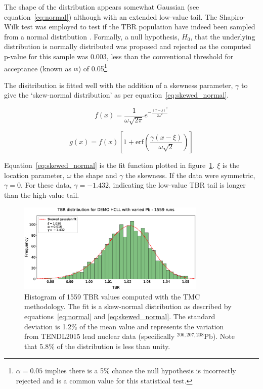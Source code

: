 The shape of the distribution appears somewhat Gaussian (see equation~\ref{eq:normal}) although with an extended low-value tail. The Shapiro-Wilk test was employed to test if the TBR population have indeed been sampled from a normal distribution \cite{Shapiro1965}. Formally, a null hypothesis, $H_{0}$, that the underlying distribution is normally distributed was proposed and rejected as the computed p-value for this sample was 0.003, less than the conventional threshold for acceptance (known as $\alpha$) of 0.05\footnote{$\alpha = 0.05$ implies there is a 5\% chance the null hypothesis is incorrectly rejected and is a common value for this statistical test.}.

The disitribution is fitted well with the addition of a skewness parameter, $\gamma$ to give the `skew-normal distribution' as per equation~\ref{eq:skewed_normal}. 

\begin{equation}
  \label{eq:normal}
  f(x) = \frac{1}{\omega \sqrt{2 \pi}} e^{-\frac{(x-\xi)^{2}}{2 \omega^{2}}}
\end{equation}

\begin{equation}
  \label{eq:skewed_normal}
  g(x) = f(x) \left[1 + \mathrm{erf} \left( \frac{\gamma(x - \xi)}{\omega \sqrt{2}} \right) \right]
\end{equation}

Equation~\ref{eq:skewed_normal} is the fit function plotted in figure~\ref{fig:tbr_distribution}. $\xi$ is the location parameter, $\omega$ the shape and $\gamma$ the skewness. If the data were symmetric, $\gamma = 0$. For these data, $\gamma = -1.432$, indicating the low-value TBR tail is longer than the high-value tail. 

\begin{figure}[H]
  \centering
	\includegraphics[width=0.8\textwidth]{hcll_hist_1559}
	\caption[DEMO HCLL TBR distribution due to lead nuclear data.]{Histogram of 1559 TBR values computed with the TMC methodology. The fit is a skew-normal distribution as described by equations~\ref{eq:normal} and \ref{eq:skewed_normal}. The standard deviation is 1.2\% of the mean value and represents the variation from TENDL2015 lead nuclear data (specifically $^{206,207,208}$Pb). Note that 5.8\% of the distribution is less than unity.}
	\label{fig:tbr_distribution}
\end{figure}

